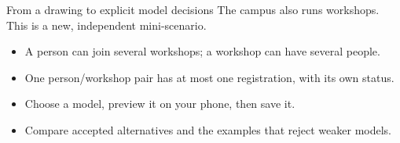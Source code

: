 \begin{frame}[t]{From a drawing to explicit model decisions}
The campus also runs workshops. This is a new, independent mini-scenario.
\medskip
\begin{itemize}
\item A person can join several workshops; a workshop can have several people.
\item One person/workshop pair has at most one registration, with its own status.
\item Choose a model, preview it on your phone, then save it.
\item Compare accepted alternatives and the examples that reject weaker models.
\end{itemize}
\end{frame}
